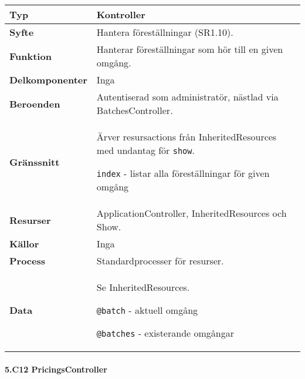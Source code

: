 \documentclass[a4paper, twoside, 11pt, titlepage]{article}
\begin{document}
			\begin {table} [ht] \begin{tabular} {  p{3.5cm} p{11.6cm} }
				\hline
				{\sffamily\textbf{Typ}} & {Kontroller} \\
				\hline
				{\sffamily\textbf{Syfte}} & {Hantera föreställningar (SR1.10).} \\
				\hline
				{\sffamily\textbf{Funktion}} & {Hanterar föreställningar som hör till en given omgång.} \\
				\hline
				{\sffamily\textbf{Delkomponenter}} & {Inga} \\
				\hline
				{\sffamily\textbf{Beroenden}} & {Autentiserad som administratör, nästlad via BatchesController.} \\
				\hline
				{\sffamily\textbf{Gränssnitt}} & {Ärver resursactions från InheritedResources med undantag för {\tt show}.

{\tt index} - listar alla föreställningar för given omgång} \\
				\hline
				{\sffamily\textbf{Resurser}} & {ApplicationController, InheritedResources och Show.} \\
				\hline
				{\sffamily\textbf{Källor}} & {Inga} \\
				\hline
				{\sffamily\textbf{Process}} & {Standardprocesser för resurser.} \\
				\hline
				{\sffamily\textbf{Data}} & {Se InheritedResources.

{\tt @batch} - aktuell omgång

{\tt @batches} - existerande omgångar} \\
				\hline
			\end{tabular} \end{table} \FloatBarrier


			\paragraph{5.C12 PricingsController}\
\end{document}
